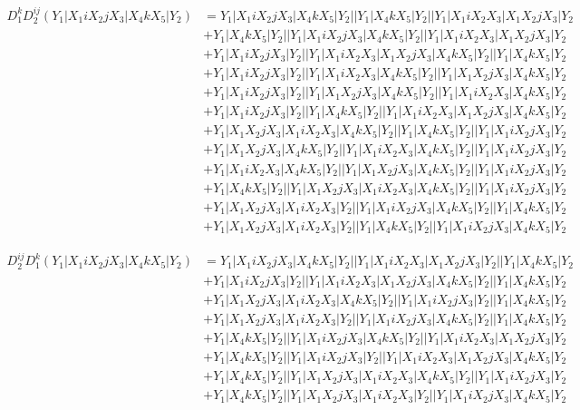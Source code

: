 \documentclass{article}[12pt]
\begin{document}
\begin{align*}
D_1^kD_2^{ij}(Y_1|X_1iX_2jX_3|X_4kX_5|Y_2)& =Y_1|X_1iX_2jX_3|X_4kX_5|Y_2||Y_1|X_4kX_5|Y_2||Y_1|X_1iX_2X_3|X_1X_2jX_3|Y_2\\ 
 & +Y_1|X_4kX_5|Y_2||Y_1|X_1iX_2jX_3|X_4kX_5|Y_2||Y_1|X_1iX_2X_3|X_1X_2jX_3|Y_2\\ 
 & +Y_1|X_1iX_2jX_3|Y_2||Y_1|X_1iX_2X_3|X_1X_2jX_3|X_4kX_5|Y_2||Y_1|X_4kX_5|Y_2\\ 
 & +Y_1|X_1iX_2jX_3|Y_2||Y_1|X_1iX_2X_3|X_4kX_5|Y_2||Y_1|X_1X_2jX_3|X_4kX_5|Y_2\\ 
 & +Y_1|X_1iX_2jX_3|Y_2||Y_1|X_1X_2jX_3|X_4kX_5|Y_2||Y_1|X_1iX_2X_3|X_4kX_5|Y_2\\ 
 & +Y_1|X_1iX_2jX_3|Y_2||Y_1|X_4kX_5|Y_2||Y_1|X_1iX_2X_3|X_1X_2jX_3|X_4kX_5|Y_2\\ 
 & +Y_1|X_1X_2jX_3|X_1iX_2X_3|X_4kX_5|Y_2||Y_1|X_4kX_5|Y_2||Y_1|X_1iX_2jX_3|Y_2\\ 
 & +Y_1|X_1X_2jX_3|X_4kX_5|Y_2||Y_1|X_1iX_2X_3|X_4kX_5|Y_2||Y_1|X_1iX_2jX_3|Y_2\\ 
 & +Y_1|X_1iX_2X_3|X_4kX_5|Y_2||Y_1|X_1X_2jX_3|X_4kX_5|Y_2||Y_1|X_1iX_2jX_3|Y_2\\ 
 & +Y_1|X_4kX_5|Y_2||Y_1|X_1X_2jX_3|X_1iX_2X_3|X_4kX_5|Y_2||Y_1|X_1iX_2jX_3|Y_2\\ 
 & +Y_1|X_1X_2jX_3|X_1iX_2X_3|Y_2||Y_1|X_1iX_2jX_3|X_4kX_5|Y_2||Y_1|X_4kX_5|Y_2\\ 
 & +Y_1|X_1X_2jX_3|X_1iX_2X_3|Y_2||Y_1|X_4kX_5|Y_2||Y_1|X_1iX_2jX_3|X_4kX_5|Y_2\end{align*}

\begin{align*}
D_2^{ij}D_1^k(Y_1|X_1iX_2jX_3|X_4kX_5|Y_2)& =Y_1|X_1iX_2jX_3|X_4kX_5|Y_2||Y_1|X_1iX_2X_3|X_1X_2jX_3|Y_2||Y_1|X_4kX_5|Y_2\\ 
 & +Y_1|X_1iX_2jX_3|Y_2||Y_1|X_1iX_2X_3|X_1X_2jX_3|X_4kX_5|Y_2||Y_1|X_4kX_5|Y_2\\ 
 & +Y_1|X_1X_2jX_3|X_1iX_2X_3|X_4kX_5|Y_2||Y_1|X_1iX_2jX_3|Y_2||Y_1|X_4kX_5|Y_2\\ 
 & +Y_1|X_1X_2jX_3|X_1iX_2X_3|Y_2||Y_1|X_1iX_2jX_3|X_4kX_5|Y_2||Y_1|X_4kX_5|Y_2\\ 
 & +Y_1|X_4kX_5|Y_2||Y_1|X_1iX_2jX_3|X_4kX_5|Y_2||Y_1|X_1iX_2X_3|X_1X_2jX_3|Y_2\\ 
 & +Y_1|X_4kX_5|Y_2||Y_1|X_1iX_2jX_3|Y_2||Y_1|X_1iX_2X_3|X_1X_2jX_3|X_4kX_5|Y_2\\ 
 & +Y_1|X_4kX_5|Y_2||Y_1|X_1X_2jX_3|X_1iX_2X_3|X_4kX_5|Y_2||Y_1|X_1iX_2jX_3|Y_2\\ 
 & +Y_1|X_4kX_5|Y_2||Y_1|X_1X_2jX_3|X_1iX_2X_3|Y_2||Y_1|X_1iX_2jX_3|X_4kX_5|Y_2\end{align*}
\end{document}
